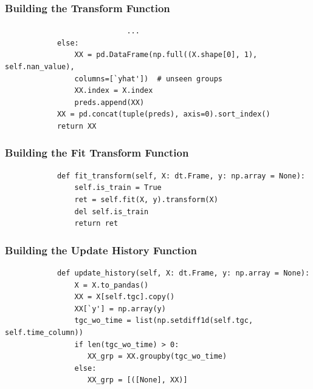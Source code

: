 \documentclass[11pt,
aspectratio=169,
hyperref={colorlinks}
]{beamer}
\begin{document}
\begin{frame}[fragile]
        \frametitle{Building the Transform Function}
        \begin{verbatim}
                            ...
            else:
                XX = pd.DataFrame(np.full((X.shape[0], 1), self.nan_value), 
                columns=[`yhat'])  # unseen groups
                XX.index = X.index
                preds.append(XX)
            XX = pd.concat(tuple(preds), axis=0).sort_index()
            return XX
        \end{verbatim}
\end{frame}
\begin{frame}[fragile]
        \frametitle{Building the Fit Transform Function}
        \begin{verbatim}
            def fit_transform(self, X: dt.Frame, y: np.array = None):
                self.is_train = True
                ret = self.fit(X, y).transform(X)
                del self.is_train
                return ret
        \end{verbatim}
\end{frame}
\begin{frame}[fragile]
        \frametitle{Building the Update History Function}
        \begin{verbatim}
            def update_history(self, X: dt.Frame, y: np.array = None):
                X = X.to_pandas()
                XX = X[self.tgc].copy()
                XX[`y'] = np.array(y)
                tgc_wo_time = list(np.setdiff1d(self.tgc, self.time_column))
                if len(tgc_wo_time) > 0:
                   XX_grp = XX.groupby(tgc_wo_time)
                else:
                   XX_grp = [([None], XX)]
        \end{verbatim}
\end{frame}
\end{document}
